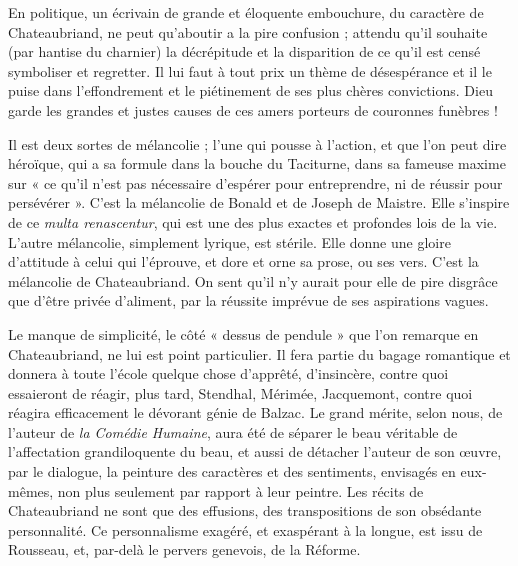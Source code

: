 \documentclass[french,twoside]{book} %
\begin{document}
En politique, un écrivain de grande et éloquente embouchure, du caractère de Chateaubriand, ne peut qu’aboutir a la pire confusion ; attendu qu’il souhaite (par hantise du charnier) la décrépitude et la disparition de ce qu’il est censé symboliser et regretter. Il lui faut à tout prix un thème de désespérance et il le puise dans l’effondrement et le piétinement de ses plus chères convictions. Dieu garde les grandes et justes causes de ces amers porteurs de couronnes funèbres !\par
Il est deux sortes de mélancolie ; l’une qui pousse à l’action, et que l’on peut dire héroïque, qui a sa formule dans la bouche du Taciturne, dans sa fameuse maxime sur « ce qu’il n’est pas nécessaire d’espérer pour entreprendre, ni de réussir pour persévérer ». C’est la mélancolie de Bonald et de Joseph de Maistre. Elle s’inspire de ce {\itshape multa renascentur}, qui est une des plus exactes et profondes lois de la vie. L’autre mélancolie, simplement lyrique, est stérile. Elle donne une gloire d’attitude à celui qui l’éprouve, et dore et orne sa prose, ou ses vers. C’est la mélancolie de Chateaubriand. On sent qu’il n’y aurait pour elle de pire disgrâce que d’être privée d’aliment, par la réussite imprévue de ses aspirations vagues.\par
Le manque de simplicité, le côté « dessus de pendule » que l’on remarque en Chateaubriand, ne lui est point particulier. Il fera partie du bagage romantique et donnera à toute l’école quelque chose d’apprêté, d’insincère, contre quoi essaieront de réagir, plus tard, Stendhal, Mérimée, Jacquemont, contre quoi réagira efficacement le dévorant génie de Balzac. Le grand mérite, selon nous, de l’auteur de {\itshape la Comédie Humaine}, aura été de séparer le beau véritable de l’affectation grandiloquente du beau, et aussi de détacher l’auteur de son œuvre, par le dialogue, la peinture des caractères et des sentiments, envisagés en eux-mêmes, non plus seulement par rapport à leur peintre. Les récits de Chateaubriand ne sont que des effusions, des transpositions de son obsédante personnalité. Ce personnalisme exagéré, et exaspérant à la longue, est issu de Rousseau, et, par-delà le pervers genevois, de la Réforme.\par
\end{document}
